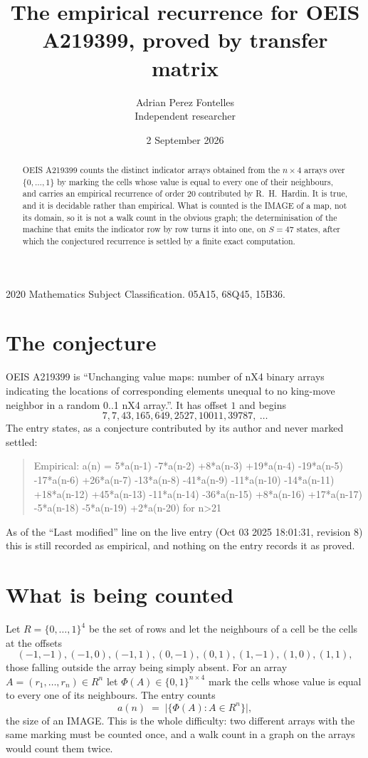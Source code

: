 \documentclass[11pt,a4paper]{article}
\title{The empirical recurrence for OEIS A219399, proved by transfer matrix}
\author{Adrian Perez Fontelles\\ \small Independent researcher}
\date{2 September 2026}
\theoremstyle{plain}
\theoremstyle{definition}
\begin{document}
\maketitle

\begin{abstract}
OEIS A219399 counts the distinct indicator arrays obtained from the $n\times4$ arrays over
$\{0,\dots,1\}$ by marking the cells whose value is equal to every one of their neighbours, and carries an
empirical recurrence of order $20$ contributed by R.~H.~Hardin. It is true, and it is
decidable rather than empirical. What is counted is the IMAGE of a map, not its domain, so it
is not a walk count in the obvious graph; the determinisation of the machine that emits the
indicator row by row turns it into one, on $S=47$ states, after which the conjectured
recurrence is settled by a finite exact computation.
\end{abstract}

\noindent\small 2020 Mathematics Subject Classification. 05A15, 68Q45, 15B36.\normalsize

\section{The conjecture}

OEIS A219399 is ``Unchanging value maps: number of nX4 binary arrays indicating the locations of corresponding elements unequal to no king-move neighbor in a random 0..1 nX4 array.''. It has offset $1$ and begins
\[
7, 7, 43, 165, 649, 2527, 10011, 39787,\ \dots
\]
The entry states, as a conjecture contributed by its author and never marked settled:
\begin{quote}
Empirical: a(n) = 5*a(n-1) -7*a(n-2) +8*a(n-3) +19*a(n-4) -19*a(n-5) -17*a(n-6) +26*a(n-7) -13*a(n-8) -41*a(n-9) -11*a(n-10) -14*a(n-11) +18*a(n-12) +45*a(n-13) -11*a(n-14) -36*a(n-15) +8*a(n-16) +17*a(n-17) -5*a(n-18) -5*a(n-19) +2*a(n-20) for n>21
\end{quote}
As of the ``Last modified'' line on the live entry (Oct 03 2025 18:01:31, revision 8) this is still
recorded as empirical, and nothing on the entry records it as proved.

\section{What is being counted}

Let $R=\{0,\dots,1\}^{4}$ be the set of rows and let the neighbours of a cell be the
cells at the offsets
\[
(-1,-1), (-1,0), (-1,1), (0,-1), (0,1), (1,-1), (1,0), (1,1),
\]
those falling outside the array being simply absent. For an array
$A=(r_1,\dots,r_n)\in R^n$ let $\Phi(A)\in\{0,1\}^{n\times4}$ mark the cells whose value
is equal to every one of its neighbours. The entry counts
\[
a(n)\;=\;\bigl|\{\Phi(A):A\in R^n\}\bigr| ,
\]
the size of an IMAGE. This is the whole difficulty: two different arrays with the same marking
must be counted once, and a walk count in a graph on the arrays would count them twice.
\end{document}
